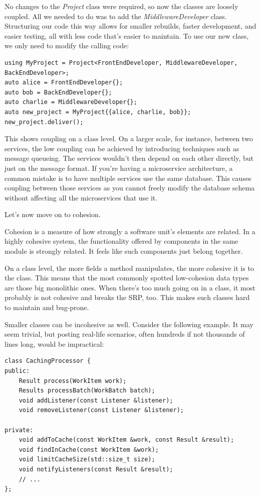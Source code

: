 No changes to the \textit{Project} class were required, so now the classes are loosely coupled. All we needed to do was to add the \textit{MiddlewareDeveloper} class. Structuring our code this way allows for smaller rebuilds, faster development, and easier testing, all with less code that's easier to maintain. To use our new class, we only need to modify the calling code:


\begin{lstlisting}[style=styleCXX]
using MyProject = Project<FrontEndDeveloper, MiddlewareDeveloper,
BackEndDeveloper>;
auto alice = FrontEndDeveloper{};
auto bob = BackEndDeveloper{};
auto charlie = MiddlewareDeveloper{};
auto new_project = MyProject{{alice, charlie, bob}};
new_project.deliver();
\end{lstlisting}

This shows coupling on a class level. On a larger scale, for instance, between two services, the low coupling can be achieved by introducing techniques such as message queueing. The services wouldn't then depend on each other directly, but just on the message format. If you're having a microservice architecture, a common mistake is to have multiple services use the same database. This causes coupling between those services as you cannot freely modify the database schema without affecting all the microservices that use it.

Let's now move on to cohesion.


Cohesion is a measure of how strongly a software unit's elements are related. In a highly cohesive system, the functionality offered by components in the same module is strongly related. It feels like such components just belong together.

On a class level, the more fields a method manipulates, the more cohesive it is to the class. This means that the most commonly spotted low-cohesion data types are those big monolithic ones. When there's too much going on in a class, it most probably is not cohesive and breaks the SRP, too. This makes such classes hard to maintain and bug-prone.

Smaller classes can be incohesive as well. Consider the following example. It may seem trivial, but posting real-life scenarios, often hundreds if not thousands of lines long, would be impractical:


\begin{lstlisting}[style=styleCXX]
class CachingProcessor {
public:
	Result process(WorkItem work);
	Results processBatch(WorkBatch batch);
	void addListener(const Listener &listener);
	void removeListener(const Listener &listener);
	
private:
	void addToCache(const WorkItem &work, const Result &result);
	void findInCache(const WorkItem &work);
	void limitCacheSize(std::size_t size);
	void notifyListeners(const Result &result);
	// ...
};

\end{lstlisting}

